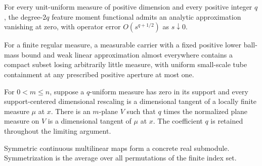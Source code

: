 \begin{lemma}
\label{lem:feature-moment-analytic-approximation}

For every unit-uniform measure of positive dimension and every positive integer $q$, the degree-$2q$ feature moment functional admits an analytic approximation vanishing at zero, with operator error $O(s^{q+1/2})$ as $s\downarrow0$.
\end{lemma}

\begin{lemma}
\label{lem:compact-uniform-tubes}

For a finite regular measure, a measurable carrier with a fixed positive lower ball-mass bound and weak linear approximation almost everywhere contains a compact subset losing arbitrarily little measure, with uniform small-scale tube containment at any prescribed positive aperture at most one.
\end{lemma}

\begin{lemma}
\label{lem:flat-tangent-from-uniform-recentering}

For $0<m\leq n$, suppose a $q$-uniform measure has zero in its support and every support-centered dimensional rescaling is a dimensional tangent of a locally finite measure $\mu$ at $x$. There is an $m$-plane $V$ such that $q$ times the normalized plane measure on $V$ is a dimensional tangent of $\mu$ at $x$. The coefficient $q$ is retained throughout the limiting argument.
\end{lemma}

\begin{definition}
\label{def:symmetric-multilinear}

Symmetric continuous multilinear maps form a concrete real submodule. Symmetrization is the average over all permutations of the finite index set.
\end{definition}

